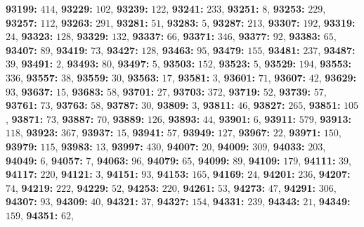 \textsf{\bfseries 93199:} $414$, \textsf{\bfseries 93229:} $102$, \textsf{\bfseries 93239:} $122$, \textsf{\bfseries 93241:} $233$, \textsf{\bfseries 93251:} $8$, \textsf{\bfseries 93253:} $229$, \textsf{\bfseries 93257:} $112$, \textsf{\bfseries 93263:} $291$, \textsf{\bfseries 93281:} $51$, \textsf{\bfseries 93283:} $5$, \textsf{\bfseries 93287:} $213$, \textsf{\bfseries 93307:} $192$, \textsf{\bfseries 93319:} $24$, \textsf{\bfseries 93323:} $128$, \textsf{\bfseries 93329:} $132$, \textsf{\bfseries 93337:} $66$, \textsf{\bfseries 93371:} $346$, \textsf{\bfseries 93377:} $92$, \textsf{\bfseries 93383:} $65$, \textsf{\bfseries 93407:} $89$, \textsf{\bfseries 93419:} $73$, \textsf{\bfseries 93427:} $128$, \textsf{\bfseries 93463:} $95$, \textsf{\bfseries 93479:} $155$, \textsf{\bfseries 93481:} $237$, \textsf{\bfseries 93487:} $39$, \textsf{\bfseries 93491:} $2$, \textsf{\bfseries 93493:} $80$, \textsf{\bfseries 93497:} $5$, \textsf{\bfseries 93503:} $152$, \textsf{\bfseries 93523:} $5$, \textsf{\bfseries 93529:} $194$, \textsf{\bfseries 93553:} $336$, \textsf{\bfseries 93557:} $38$, \textsf{\bfseries 93559:} $30$, \textsf{\bfseries 93563:} $17$, \textsf{\bfseries 93581:} $3$, \textsf{\bfseries 93601:} $71$, \textsf{\bfseries 93607:} $42$, \textsf{\bfseries 93629:} $93$, \textsf{\bfseries 93637:} $15$, \textsf{\bfseries 93683:} $58$, \textsf{\bfseries 93701:} $27$, \textsf{\bfseries 93703:} $372$, \textsf{\bfseries 93719:} $52$, \textsf{\bfseries 93739:} $57$, \textsf{\bfseries 93761:} $73$, \textsf{\bfseries 93763:} $58$, \textsf{\bfseries 93787:} $30$, \textsf{\bfseries 93809:} $3$, \textsf{\bfseries 93811:} $46$, \textsf{\bfseries 93827:} $265$, \textsf{\bfseries 93851:} $105$, \textsf{\bfseries 93871:} $73$, \textsf{\bfseries 93887:} $70$, \textsf{\bfseries 93889:} $126$, \textsf{\bfseries 93893:} $44$, \textsf{\bfseries 93901:} $6$, \textsf{\bfseries 93911:} $579$, \textsf{\bfseries 93913:} $118$, \textsf{\bfseries 93923:} $367$, \textsf{\bfseries 93937:} $15$, \textsf{\bfseries 93941:} $57$, \textsf{\bfseries 93949:} $127$, \textsf{\bfseries 93967:} $22$, \textsf{\bfseries 93971:} $150$, \textsf{\bfseries 93979:} $115$, \textsf{\bfseries 93983:} $13$, \textsf{\bfseries 93997:} $430$, \textsf{\bfseries 94007:} $20$, \textsf{\bfseries 94009:} $309$, \textsf{\bfseries 94033:} $203$, \textsf{\bfseries 94049:} $6$, \textsf{\bfseries 94057:} $7$, \textsf{\bfseries 94063:} $96$, \textsf{\bfseries 94079:} $65$, \textsf{\bfseries 94099:} $89$, \textsf{\bfseries 94109:} $179$, \textsf{\bfseries 94111:} $39$, \textsf{\bfseries 94117:} $220$, \textsf{\bfseries 94121:} $3$, \textsf{\bfseries 94151:} $93$, \textsf{\bfseries 94153:} $165$, \textsf{\bfseries 94169:} $24$, \textsf{\bfseries 94201:} $236$, \textsf{\bfseries 94207:} $74$, \textsf{\bfseries 94219:} $222$, \textsf{\bfseries 94229:} $52$, \textsf{\bfseries 94253:} $220$, \textsf{\bfseries 94261:} $53$, \textsf{\bfseries 94273:} $47$, \textsf{\bfseries 94291:} $306$, \textsf{\bfseries 94307:} $93$, \textsf{\bfseries 94309:} $40$, \textsf{\bfseries 94321:} $37$, \textsf{\bfseries 94327:} $154$, \textsf{\bfseries 94331:} $239$, \textsf{\bfseries 94343:} $21$, \textsf{\bfseries 94349:} $159$, \textsf{\bfseries 94351:} $62$, 
